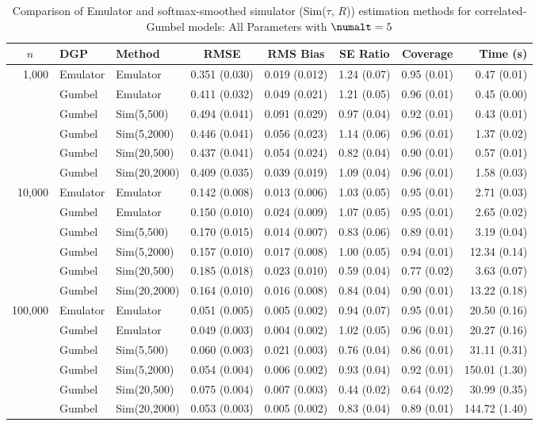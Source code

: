 \begin{table}[htbp]
\centering
\footnotesize
\begin{tabular}{@{}rllrrrrr@{}}
\toprule
\multicolumn{1}{c}{$n$} & \multicolumn{1}{l}{DGP} & \multicolumn{1}{l}{Method} & \multicolumn{1}{c}{RMSE} & \multicolumn{1}{c}{RMS Bias} & \multicolumn{1}{c}{SE Ratio} & \multicolumn{1}{c}{Coverage} & \multicolumn{1}{r}{Time (s)} \\
\midrule
\multirow{6}{*}{1,000} & Emulator & Emulator & 0.351 (0.030) & 0.019 (0.012) & 1.24 (0.07) & 0.95 (0.01) & 0.47 (0.01) \\
 & Gumbel & Emulator & 0.411 (0.032) & 0.049 (0.021) & 1.21 (0.05) & 0.96 (0.01) & 0.45 (0.00) \\
 & Gumbel & Sim(5,500) & 0.494 (0.041) & 0.091 (0.029) & 0.97 (0.04) & 0.92 (0.01) & 0.43 (0.01) \\
 & Gumbel & Sim(5,2000) & 0.446 (0.041) & 0.056 (0.023) & 1.14 (0.06) & 0.96 (0.01) & 1.37 (0.02) \\
 & Gumbel & Sim(20,500) & 0.437 (0.041) & 0.054 (0.024) & 0.82 (0.04) & 0.90 (0.01) & 0.57 (0.01) \\
 & Gumbel & Sim(20,2000) & 0.409 (0.035) & 0.039 (0.019) & 1.09 (0.04) & 0.96 (0.01) & 1.58 (0.03) \\
\midrule
\multirow{6}{*}{10,000} & Emulator & Emulator & 0.142 (0.008) & 0.013 (0.006) & 1.03 (0.05) & 0.95 (0.01) & 2.71 (0.03) \\
 & Gumbel & Emulator & 0.150 (0.010) & 0.024 (0.009) & 1.07 (0.05) & 0.95 (0.01) & 2.65 (0.02) \\
 & Gumbel & Sim(5,500) & 0.170 (0.015) & 0.014 (0.007) & 0.83 (0.06) & 0.89 (0.01) & 3.19 (0.04) \\
 & Gumbel & Sim(5,2000) & 0.157 (0.010) & 0.017 (0.008) & 1.00 (0.05) & 0.94 (0.01) & 12.34 (0.14) \\
 & Gumbel & Sim(20,500) & 0.185 (0.018) & 0.023 (0.010) & 0.59 (0.04) & 0.77 (0.02) & 3.63 (0.07) \\
 & Gumbel & Sim(20,2000) & 0.164 (0.010) & 0.016 (0.008) & 0.84 (0.04) & 0.90 (0.01) & 13.22 (0.18) \\
\midrule
\multirow{6}{*}{100,000} & Emulator & Emulator & 0.051 (0.005) & 0.005 (0.002) & 0.94 (0.07) & 0.95 (0.01) & 20.50 (0.16) \\
 & Gumbel & Emulator & 0.049 (0.003) & 0.004 (0.002) & 1.02 (0.05) & 0.96 (0.01) & 20.27 (0.16) \\
 & Gumbel & Sim(5,500) & 0.060 (0.003) & 0.021 (0.003) & 0.76 (0.04) & 0.86 (0.01) & 31.11 (0.31) \\
 & Gumbel & Sim(5,2000) & 0.054 (0.004) & 0.006 (0.002) & 0.93 (0.04) & 0.92 (0.01) & 150.01 (1.30) \\
 & Gumbel & Sim(20,500) & 0.075 (0.004) & 0.007 (0.003) & 0.44 (0.02) & 0.64 (0.02) & 30.99 (0.35) \\
 & Gumbel & Sim(20,2000) & 0.053 (0.003) & 0.005 (0.002) & 0.83 (0.04) & 0.89 (0.01) & 144.72 (1.40) \\
\bottomrule
\end{tabular}
\caption{Comparison of Emulator and softmax-smoothed simulator (Sim($\tau$, $R$)) estimation methods for correlated-Gumbel models: All Parameters with $\numalt=5$}
\label{tab:emulator_vs_sim_gumbel:5:all}
\end{table}